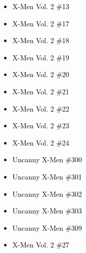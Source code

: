 \documentclass[12pt]{article}
\newcommand{\checkbox}{\raisebox{0.0ex}{\fbox{\rule{0ex}{1.5ex} \rule{1.5ex}{0ex}}}}
\begin{document}
\vspace{0.3cm}
\noindent
\begin{tcolorbox}[
  colback=white!95!gray,
  colframe=black,
  width=\textwidth,
  arc=4mm,
  auto outer arc,
  boxrule=0.8pt,
  left=8pt,right=8pt,top=8pt,bottom=8pt
]
\begin{itemize}[left=0pt,label={\checkbox}]
    \item \textcolor{black}{X-Men Vol. 2 \#13}
    \item \textcolor{black}{X-Men Vol. 2 \#17}
    \item \textcolor{black}{X-Men Vol. 2 \#18}
    \item \textcolor{black}{X-Men Vol. 2 \#19}
    \item \textcolor{black}{X-Men Vol. 2 \#20}
    \item \textcolor{black}{X-Men Vol. 2 \#21}
    \item \textcolor{black}{X-Men Vol. 2 \#22}
    \item \textcolor{black}{X-Men Vol. 2 \#23}
    \item \textcolor{black}{X-Men Vol. 2 \#24}
    \item \textcolor{black}{Uncanny X-Men \#300}
    \item \textcolor{black}{Uncanny X-Men \#301}
    \item \textcolor{black}{Uncanny X-Men \#302}
    \item \textcolor{black}{Uncanny X-Men \#303}
    \item \textcolor{black}{Uncanny X-Men \#309}
    \item \textcolor{black}{X-Men Vol. 2 \#27}
\end{itemize}
\end{tcolorbox}

\newpage
{}
\end{document}
